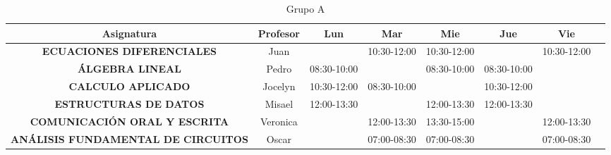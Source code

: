 \documentclass[10pt,letterpaper,twoside,openright]{article}
\begin{document}
	\begin{table}[h!]
		\centering
		\begin{adjustbox}{max width=\textwidth}
		\begin{tabular}{c||ccccccc}
		\textbf{Asignatura}                        & \textbf{Profesor} & \textbf{Lun} & \textbf{Mar} & \textbf{Mie} & \textbf{Jue} & \textbf{Vie} \\ \hline \hline
		\textbf{ECUACIONES DIFERENCIALES}          & Juan              &              & 10:30-12:00  & 10:30-12:00  &              & 10:30-12:00  \\
		\textbf{ÁLGEBRA LINEAL}                    & Pedro             & 08:30-10:00  &              & 08:30-10:00  & 08:30-10:00  &              \\
		\textbf{CALCULO APLICADO}                  & Jocelyn           & 10:30-12:00  & 08:30-10:00  &              & 10:30-12:00  &              \\
		\textbf{ESTRUCTURAS DE DATOS}              & Misael            & 12:00-13:30  &              & 12:00-13:30  & 12:00-13:30  &              \\
		\textbf{COMUNICACIÓN ORAL Y ESCRITA}       & Veronica          &              & 12:00-13:30  & 13:30-15:00  &              & 12:00-13:30  \\
		\textbf{ANÁLISIS FUNDAMENTAL DE CIRCUITOS} & Oscar             &              & 07:00-08:30  & 07:00-08:30  &              & 07:00-08:30
		\end{tabular}
		\end{adjustbox}
		\caption{Grupo A}
		\label{tab:grupo_a}
	\end{table}
\end{document}
